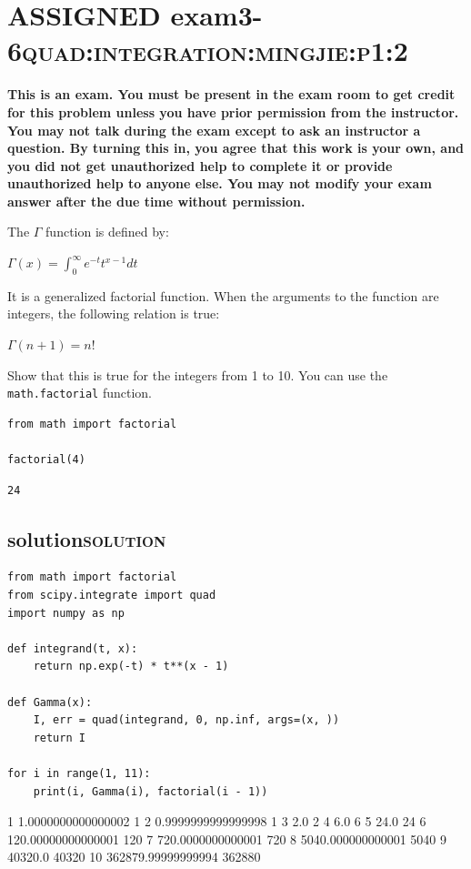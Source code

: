 \documentclass[11pt]{article}
\begin{document}
\section{{\bfseries\sffamily ASSIGNED} exam3-6\hfill{}\textsc{quad:integration:mingjie:p1:2}}
\label{sec:org0798cc2}
\textbf{This is an exam. You must be present in the exam room to get credit for this problem unless you have prior permission from the instructor. You may not talk during the exam except to ask an instructor a question. By turning this in, you agree that this work is your own, and you did not get unauthorized help to complete it or provide unauthorized help to anyone else. You may not modify your exam answer after the due time without permission.}

The \(\Gamma\) function is defined by:

\(\Gamma(x) = \int_0^\infty e^{-t}t^{x-1} dt\)

It is a generalized factorial function. When the arguments to the function are integers, the following relation is true:

\(\Gamma(n + 1) = n!\)

Show that this is true for the integers from 1 to 10. You can use the \texttt{math.factorial} function.

\begin{verbatim}
from math import factorial

factorial(4)
\end{verbatim}

\begin{verbatim}
24
\end{verbatim}

\subsection{solution\hfill{}\textsc{solution}}
\label{sec:orgf52e1ce}

\begin{verbatim}
from math import factorial
from scipy.integrate import quad
import numpy as np

def integrand(t, x):
    return np.exp(-t) * t**(x - 1)

def Gamma(x):
    I, err = quad(integrand, 0, np.inf, args=(x, ))
    return I

for i in range(1, 11):
    print(i, Gamma(i), factorial(i - 1))
\end{verbatim}

1 1.0000000000000002 1
2 0.9999999999999998 1
3 2.0 2
4 6.0 6
5 24.0 24
6 120.00000000000001 120
7 720.0000000000001 720
8 5040.000000000001 5040
9 40320.0 40320
10 362879.99999999994 362880
\end{document}
